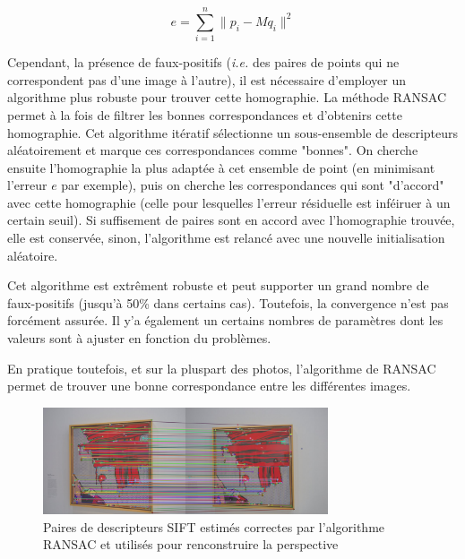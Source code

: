\documentclass[12pt,a4paper]{article}
\begin{document}
$$ e = \sum_{i = 1}^{n}\|p_i - Mq_i\|^2$$

Cependant, la présence de faux-positifs (\emph{i.e.} des paires de points qui ne correspondent pas d'une image à l'autre), il est nécessaire d'employer un algorithme plus robuste pour trouver cette homographie. La méthode RANSAC~\citep{fischler1981random} permet à la fois de filtrer les bonnes correspondances et d'obtenirs cette homographie. Cet algorithme itératif sélectionne un sous-ensemble de descripteurs aléatoirement et marque ces correspondances comme "bonnes". On cherche ensuite l'homographie la plus adaptée à cet ensemble de point (en minimisant l'erreur $e$ par exemple), puis on cherche les correspondances qui sont "d'accord" avec cette homographie (celle pour lesquelles l'erreur résiduelle est inféiruer à un certain seuil). Si suffisement de paires sont en accord avec l'homographie trouvée, elle est conservée, sinon, l'algorithme est relancé avec une nouvelle initialisation aléatoire.

Cet algorithme est extrêment robuste et peut supporter un grand nombre de faux-positifs (jusqu'à 50\% dans certains cas). Toutefois, la convergence n'est pas forcément assurée. Il y'a également un certains nombres de paramètres dont les valeurs sont à ajuster en fonction du problèmes.

En pratique toutefois, et sur la pluspart des photos, l'algorithme de RANSAC permet de trouver une bonne correspondance entre les différentes images. 

\begin{figure}[H]
  \centering
  \includegraphics[width=0.75\textwidth]{Fig/sift_ransac.png}
  \caption{Paires de descripteurs SIFT estimés correctes par l'algorithme RANSAC et utilisés pour renconstruire la perspective}
\end{figure}
\end{document}
